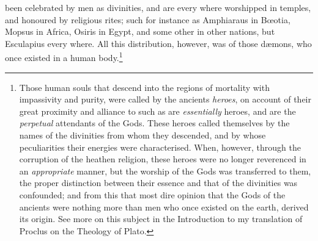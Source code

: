 \documentclass[12pt]{article}
\begin{document}
been celebrated by men as divinities, and are every where worshipped in
temples, and honoured by religious rites; such for instance as Amphiaraus in
B{\oe}otia, Mopsus in Africa, Osiris in Egypt, and some other in other nations,
but Esculapius every where. All this distribution, however, was of those
d{\ae}mons, who once existed in a human body.\footnote{Those human souls that
descend into the regions of mortality with impassivity and purity, were called
by the ancients \textit{heroes}, on account of their great proximity and
alliance to such as are \textit{essentially} heroes, and are the
\textit{perpetual} attendants of the Gods. These heroes called themselves by
the names of the divinities from whom they descended, and by whose
peculiarities their energies were characterised. When, however, through the
corruption of the heathen religion, these heroes were no longer reverenced in
an \textit{appropriate} manner, but the worship of the Gods was transferred to
them, the proper distinction between their essence and that of the divinities
was confounded; and from this that most dire opinion that the Gods of the
ancients were nothing more than men who once existed on the earth, derived its
origin. See more on this subject in the Introduction to my translation of
Proclus on the Theology of Plato.}
\end{document}
